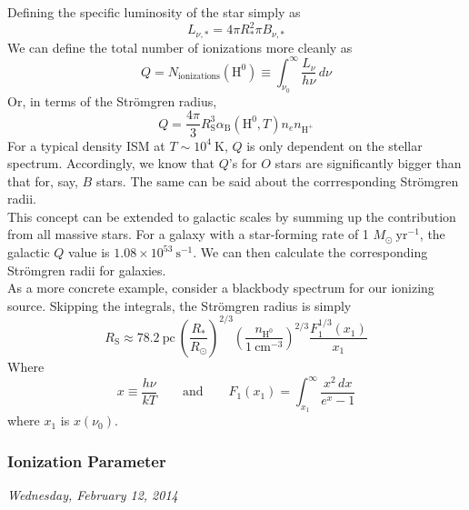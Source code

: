 \documentclass[10pt]{article}
\numberwithin{equation}{section}
\newcommand{\n}{\noindent}
\begin{document}
\n Defining the specific luminosity of the star simply as
\begin{equation}
  \label{eq:strom:17} L_{\nu, *} = 4\pi R_*^2 \pi B_{\nu, *}
\end{equation}
We can define the total number of ionizations more cleanly as 
\begin{equation}
  \label{eq:strom:18} Q = N_{\mathrm{ionizations}}(\mathrm{H^0}) \equiv 
  \int_{\nu_0}^\infty \frac{L_\nu}{h\nu}\,d\nu
\end{equation}
Or, in terms of the Str\"omgren radius,
\begin{equation}
  \label{eq:strom:19} \boxed{Q = \frac{4\pi}{3}R_{\mathrm{S}}^3
  \alpha_{\mathrm{B}}(\mathrm{H^0},T)n_en_{\mathrm{H^+}}}
\end{equation}
For a typical density ISM at $T\sim 10^4\ \mathrm{K}$, $Q$ is only dependent
on the stellar spectrum. Accordingly, we know that $Q$'s for $O$ stars are
significantly bigger than that for, say, $B$ stars. The same can be said about
the corrresponding Str\"omgren radii.\\

\n This concept can be extended to galactic scales by summing up the
contribution from all massive stars. For a galaxy with a star-forming rate of 1
$M_\odot\ \mathrm{yr}^{-1}$, the galactic $Q$ value is $1.08\times 10^{53}\
\mathrm{s^{-1}}$. We can then calculate the corresponding Str\"omgren radii for
galaxies.\\

\n As a more concrete example, consider a blackbody spectrum for our ionizing
source. Skipping the integrals, the Str\"omgren radius is simply
\begin{equation}
  \label{eq:strom:20} R_{\mathrm{S}} \approx 78.2\ \mathrm{pc}\
  \left(\frac{R_*}{R_\odot}\right)^{2/3} \left(\frac{n_{\mathrm{H^0}}}{1\
  \mathrm{cm^{-3}}}\right)^{2/3} \frac{F_1^{1/3}(x_1)}{x_1}
\end{equation}
Where
\begin{equation}
  \label{eq:strom:21} x \equiv \frac{h\nu}{kT} \qquad \textrm{and} \qquad
  F_1(x_1) = \int_{x_1}^\infty \frac{x^2\,dx}{e^x-1}
\end{equation}
where $x_1$ is $x(\nu_0)$.

\subsubsection{Ionization Parameter} %
\label{ssub:ionization_parameter}
\textit{Wednesday, February 12, 2014}\\
\end{document}
